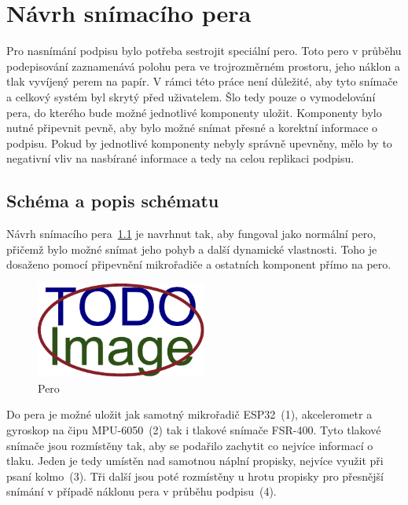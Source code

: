 \chapter{Návrh snímacího pera}
Pro nasnímání podpisu bylo potřeba sestrojit speciální pero.                                        %
Toto pero v průběhu podepisování zaznamenává polohu pera ve trojrozměrném prostoru,                 %
jeho náklon a tlak vyvíjený perem na papír.                                                         %
V rámci této práce není důležité, aby tyto snímače a celkový systém byl skrytý před uživatelem.     %
Šlo tedy pouze o vymodelování pera, do kterého bude možné jednotlivé komponenty uložit.             %
Komponenty bylo nutné připevnit pevně, aby bylo možné snímat přesné a korektní informace o podpisu. %
Pokud by jednotlivé komponenty nebyly správně upevněny,                                             %
mělo by to negativní vliv na nasbírané informace a tedy na celou replikaci podpisu.                 %
 
\section{Schéma a popis schématu}
Návrh snímacího pera~\ref{fig:pero} je navrhnut tak, aby fungoval jako normální pero, 
přičemž bylo možné snímat jeho pohyb a další dynamické vlastnosti.
Toho je dosaženo pomocí připevnění mikrořadiče a ostatních komponent přímo na pero.

\begin{figure}[h]
  \centering
  \includegraphics[width=0.5\textwidth]{obrazky-figures/placeholder.pdf}
  \caption{Pero} 
  \label{fig:pero}
\end{figure}

Do pera je možné uložit jak samotný mikrořadič ESP32~(1), akcelerometr a gyroskop na čipu MPU-6050~(2) tak i tlakové snímače FSR-400.
Tyto tlakové snímače jsou rozmístěny tak, aby se podařilo zachytit co nejvíce informací o tlaku.
Jeden je tedy umístěn nad samotnou náplní propisky, nejvíce využit při psaní kolmo~(3).
Tři další jsou poté rozmístěny u hrotu propisky pro přesnější snímání v případě náklonu pera v průběhu podpisu~(4). 


